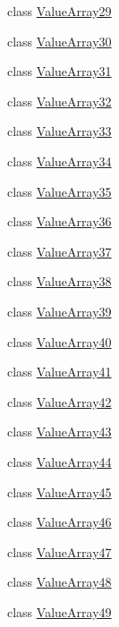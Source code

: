 \begin{DoxyCompactItemize}
class \hyperlink{classtesting_1_1internal_1_1_value_array29}{Value\-Array29}
\item 
class \hyperlink{classtesting_1_1internal_1_1_value_array30}{Value\-Array30}
\item 
class \hyperlink{classtesting_1_1internal_1_1_value_array31}{Value\-Array31}
\item 
class \hyperlink{classtesting_1_1internal_1_1_value_array32}{Value\-Array32}
\item 
class \hyperlink{classtesting_1_1internal_1_1_value_array33}{Value\-Array33}
\item 
class \hyperlink{classtesting_1_1internal_1_1_value_array34}{Value\-Array34}
\item 
class \hyperlink{classtesting_1_1internal_1_1_value_array35}{Value\-Array35}
\item 
class \hyperlink{classtesting_1_1internal_1_1_value_array36}{Value\-Array36}
\item 
class \hyperlink{classtesting_1_1internal_1_1_value_array37}{Value\-Array37}
\item 
class \hyperlink{classtesting_1_1internal_1_1_value_array38}{Value\-Array38}
\item 
class \hyperlink{classtesting_1_1internal_1_1_value_array39}{Value\-Array39}
\item 
class \hyperlink{classtesting_1_1internal_1_1_value_array40}{Value\-Array40}
\item 
class \hyperlink{classtesting_1_1internal_1_1_value_array41}{Value\-Array41}
\item 
class \hyperlink{classtesting_1_1internal_1_1_value_array42}{Value\-Array42}
\item 
class \hyperlink{classtesting_1_1internal_1_1_value_array43}{Value\-Array43}
\item 
class \hyperlink{classtesting_1_1internal_1_1_value_array44}{Value\-Array44}
\item 
class \hyperlink{classtesting_1_1internal_1_1_value_array45}{Value\-Array45}
\item 
class \hyperlink{classtesting_1_1internal_1_1_value_array46}{Value\-Array46}
\item 
class \hyperlink{classtesting_1_1internal_1_1_value_array47}{Value\-Array47}
\item 
class \hyperlink{classtesting_1_1internal_1_1_value_array48}{Value\-Array48}
\item 
class \hyperlink{classtesting_1_1internal_1_1_value_array49}{Value\-Array49}
\item 

\end{DoxyCompactItemize}
